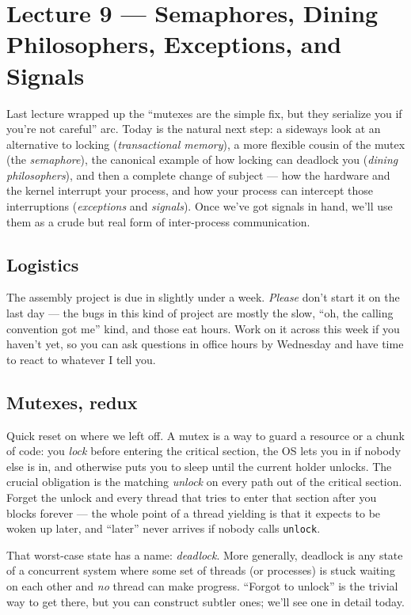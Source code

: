\documentclass[11pt]{article}
\begin{document}
\section{Lecture 9 --- Semaphores, Dining Philosophers, Exceptions, and Signals}

Last lecture wrapped up the ``mutexes are the simple fix, but they
serialize you if you're not careful'' arc. Today is the natural next
step: a sideways look at an alternative to locking
(\emph{transactional memory}), a more flexible cousin of the mutex
(the \emph{semaphore}), the canonical example of how locking can
deadlock you (\emph{dining philosophers}), and then a complete change
of subject --- how the hardware and the kernel interrupt your process,
and how your process can intercept those interruptions
(\emph{exceptions} and \emph{signals}). Once we've got signals in
hand, we'll use them as a crude but real form of inter-process
communication.

\subsection*{Logistics}

The assembly project is due in slightly under a week. \emph{Please}
don't start it on the last day --- the bugs in this kind of project
are mostly the slow, ``oh, the calling convention got me'' kind, and
those eat hours. Work on it across this week if you haven't yet, so
you can ask questions in office hours by Wednesday and have time to
react to whatever I tell you.

\subsection*{Mutexes, redux}

Quick reset on where we left off. A mutex is a way to guard a resource
or a chunk of code: you \emph{lock} before entering the critical
section, the OS lets you in if nobody else is in, and otherwise puts
you to sleep until the current holder unlocks. The crucial obligation
is the matching \emph{unlock} on every path out of the critical
section. Forget the unlock and every thread that tries to enter that
section after you blocks forever --- the whole point of a thread
yielding is that it expects to be woken up later, and ``later'' never
arrives if nobody calls \texttt{unlock}.

That worst-case state has a name: \emph{deadlock}. More generally,
deadlock is any state of a concurrent system where some set of
threads (or processes) is stuck waiting on each other and \emph{no}
thread can make progress. ``Forgot to unlock'' is the trivial way to
get there, but you can construct subtler ones; we'll see one in
detail today.
\end{document}
